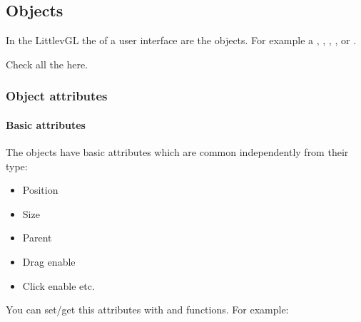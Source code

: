\documentclass[letterpaper,10pt,english]{sphinxmanual}
\begin{document}
\subsection{Objects}
\label{\detokenize{overview/objects:objects}}\label{\detokenize{overview/objects::doc}}
In the LittlevGL the  of a user interface are the objects.
For example a {\hyperref[\detokenize{object-types/btn::doc}]{}}, {\hyperref[\detokenize{object-types/label::doc}]{}}, {\hyperref[\detokenize{object-types/img::doc}]{}}, {\hyperref[\detokenize{object-types/list::doc}]{}}, {\hyperref[\detokenize{object-types/chart::doc}]{}} or {\hyperref[\detokenize{object-types/ta::doc}]{}}.

Check all the {\hyperref[\detokenize{object-types/index::doc}]{}} here.


\subsubsection{Object attributes}
\label{\detokenize{overview/objects:object-attributes}}

\paragraph{Basic attributes}
\label{\detokenize{overview/objects:basic-attributes}}
The objects have basic attributes which are common independently from their type:
\begin{itemize}
\item {} 
Position

\item {} 
Size

\item {} 
Parent

\item {} 
Drag enable

\item {} 
Click enable etc.

\end{itemize}

You can set/get this attributes with  and  functions. For example:
\end{document}

